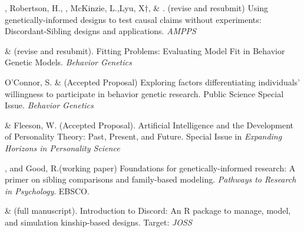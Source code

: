 \item \meb, Robertson, H.\noteA, \jt, McKinzie, L.,\noteA Lyu, X$\dagger$, \& \joe. (revise and resubmit) Using genetically-informed designs to test causal claims without experiments: Discordant-Sibling designs and applications. \href{https://osf.io/zpdwt/}{\small\color{blue}{osf.io/zpdwt/}} \textit{AMPPS} %

\item \meb \& \joe (revise and resubmit). Fitting Problems: Evaluating Model Fit in Behavior Genetic Models. \textit{Behavior Genetics}  \href{https://doi.org/10.31234/osf.io/qys83}{\small\color{blue}{10.31234/osf.io/qys83}}


\item O'Connor, S. \& \meb (Accepted Proposal) Exploring factors differentiating individuals’ willingness to participate in behavior genetic research. Public Science Special Issue. \textit{Behavior Genetics}

\item \meb \& Fleeson, W. (Accepted Proposal). Artificial Intelligence and the Development of Personality Theory: Past, Present, and Future. Special Issue in \textit{Expanding Horizons in Personality Science}


\item \meb, and Good, R.\noteA (working paper) Foundations for genetically-informed research: A primer on sibling comparisons and family-based modeling. \textit{Pathways to Research in Psychology}. EBSCO.

%





\item \jt \& \meb (full manuscript). Introduction to Discord: An R package to manage, model, and simulation kinship-based designs. Target: \textit{JOSS}

